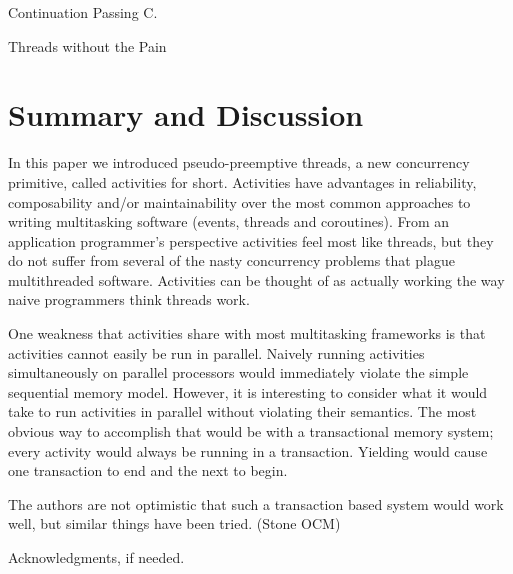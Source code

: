 \documentclass[10pt,preprint]{sigplanconf}
\begin{document}
Continuation Passing C.

Threads without the Pain

\section{Summary and Discussion}

In this paper we introduced pseudo-preemptive threads, a new concurrency primitive, called activities for short.
Activities have advantages in reliability, composability and/or maintainability over the most common approaches to writing multitasking software (events, threads and coroutines).
From an application programmer's perspective activities feel most like threads, but they do not suffer from several of the nasty concurrency problems that plague multithreaded software.
Activities can be thought of as actually working the way naive programmers think threads work.

One weakness that activities share with most multitasking frameworks is that activities cannot easily be run in parallel.
Naively running activities simultaneously on parallel processors would immediately violate the simple sequential memory model.
However, it is interesting to consider what it would take to run activities in parallel without violating their semantics.
The most obvious way to accomplish that would be with a transactional memory system; every activity would always be running in a transaction.
Yielding would cause one transaction to end and the next to begin.

The authors are not optimistic that such a transaction based system would work well, but similar things have been tried. (Stone OCM)

\cite{ONeill2015}

\acks

Acknowledgments, if needed.








\end{document}
